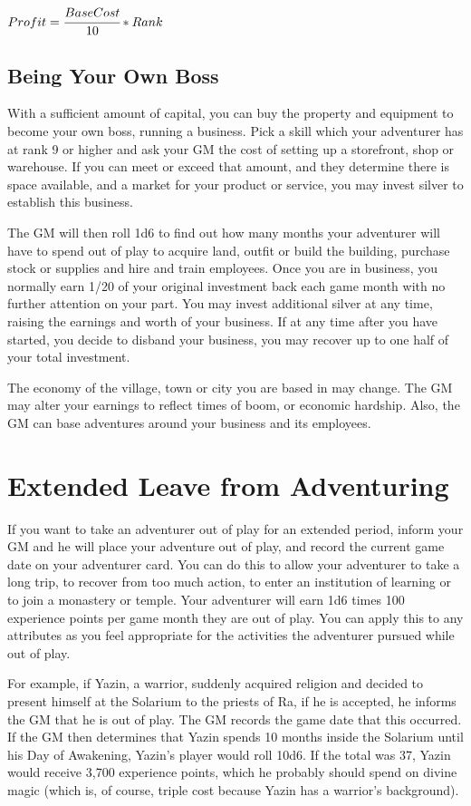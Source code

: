 \begin{normboxc}
\large
$Profit = \cfrac{Base Cost}{10} * Rank$
\end{normboxc}
\subsection{Being Your Own Boss}
With a sufficient amount of capital, you can buy the property and equipment to become your own boss, running a business. Pick a skill which your adventurer has at rank 9 or higher and ask your GM the cost of setting up a storefront, shop or warehouse. If you can meet or exceed that amount, and they determine there is space available, and a market for your product or service, you may invest silver to establish this business.

The GM will then roll 1d6 to find out how many months your adventurer will have to spend out of play to acquire land, outfit or build the building, purchase stock or supplies and hire and train employees. Once you are in business, you normally earn 1/20 of your original investment back each game month with no further attention on your part. You may invest additional silver at any time, raising the earnings and worth of your business. If at any time after you have started, you decide to disband your business, you may recover up to one half of your total investment.

The economy of the village, town or city you are based in may change. The GM may alter your earnings to reflect times of boom, or economic hardship. Also, the GM can base adventures around your business and its employees.
\section{Extended Leave from Adventuring}
If you want to take an adventurer out of play for an extended period, inform your GM and he will place your adventure out of play, and record the current game date on your adventurer card. You can do this to allow your adventurer to take a long trip, to recover from too much action, to enter an institution of learning or to join a monastery or temple. Your adventurer will earn 1d6 times 100 experience points per game month they are out of play. You can apply this to any attributes as you feel appropriate for the activities the adventurer pursued while out of play. 

For example, if Yazin, a warrior, suddenly acquired religion and decided to present himself at the Solarium to the priests of Ra, if he is accepted, he informs the GM that he is out of play. The GM records the game date that this occurred. If the GM then determines that Yazin spends 10 months inside the Solarium until his Day of Awakening, Yazin's player would roll 10d6. If the total was 37, Yazin would receive 3,700 experience points, which he probably should spend on divine magic (which is, of course, triple cost because Yazin has a warrior's background).
